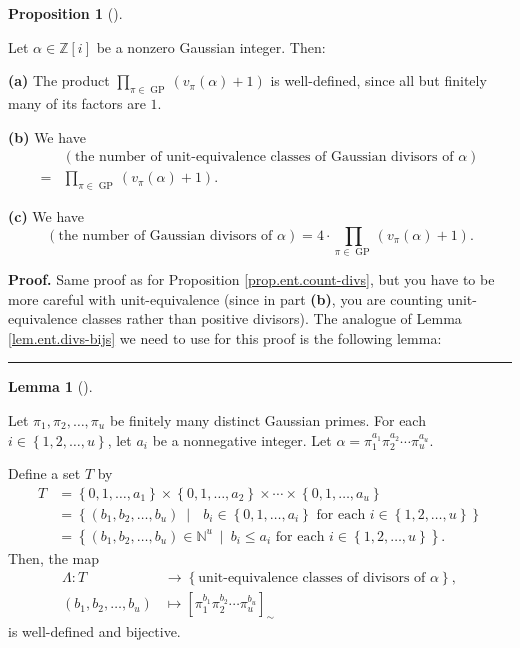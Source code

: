 \documentclass[numbers=enddot,12pt,final,onecolumn,notitlepage]{scrartcl}%
\numberwithin{exer}{subsection}
\theoremstyle{definition}
\newtheorem{lem}[theo]{Lemma}
\newenvironment{lemma}[1][]
{\begin{lem}[#1]\begin{leftbar}}
{\end{leftbar}\end{lem}}
\newtheorem{prop}[theo]{Proposition}
\newenvironment{proposition}[1][]
{\begin{prop}[#1]\begin{leftbar}}
{\end{leftbar}\end{prop}}
\newenvironment{proof}[1][Proof]{\noindent\textbf{#1.} }{\ \rule{0.5em}{0.5em}}
\let\prodnonlimits\prod
\renewcommand{\prod}{\prodnonlimits\limits}
\begin{document}
\begin{proposition}
Let $\alpha\in\mathbb{Z}\left[  i\right]  $ be a nonzero Gaussian integer. Then:

\textbf{(a)} The product $\prod_{\pi\in\operatorname*{GP}}\left(  v_{\pi
}\left(  \alpha\right)  +1\right)  $ is well-defined, since all but finitely
many of its factors are $1$.

\textbf{(b)} We have%
\begin{align*}
&  \left(  \text{the number of unit-equivalence classes of Gaussian divisors
of }\alpha\right) \\
=  &  \prod_{\pi\in\operatorname*{GP}}\left(  v_{\pi}\left(  \alpha\right)
+1\right)  .
\end{align*}


\textbf{(c)} We have%
\[
\left(  \text{the number of Gaussian divisors of }\alpha\right)  =4\cdot
\prod_{\pi\in\operatorname*{GP}}\left(  v_{\pi}\left(  \alpha\right)
+1\right)  .
\]

\end{proposition}

\begin{proof}
Same proof as for Proposition \ref{prop.ent.count-divs}, but you have to be
more careful with unit-equivalence (since in part \textbf{(b)}, you are
counting unit-equivalence classes rather than positive divisors). The analogue
of Lemma \ref{lem.ent.divs-bijs} we need to use for this proof is the
following lemma:
\end{proof}

\begin{lemma}
\label{lem.Z[i].divs-bijs}Let $\pi_{1},\pi_{2},\ldots,\pi_{u}$ be finitely
many distinct Gaussian primes. For each $i\in\left\{  1,2,\ldots,u\right\}  $,
let $a_{i}$ be a nonnegative integer. Let $\alpha=\pi_{1}^{a_{1}}\pi
_{2}^{a_{2}}\cdots\pi_{u}^{a_{u}}$.

Define a set $T$ by%
\begin{align*}
T  &  =\left\{  0,1,\ldots,a_{1}\right\}  \times\left\{  0,1,\ldots
,a_{2}\right\}  \times\cdots\times\left\{  0,1,\ldots,a_{u}\right\} \\
&  =\left\{  \left(  b_{1},b_{2},\ldots,b_{u}\right)  \ \mid\text{ }b_{i}%
\in\left\{  0,1,\ldots,a_{i}\right\}  \text{ for each }i\in\left\{
1,2,\ldots,u\right\}  \right\} \\
&  =\left\{  \left(  b_{1},b_{2},\ldots,b_{u}\right)  \in\mathbb{N}^{u}%
\ \mid\ b_{i}\leq a_{i}\text{ for each }i\in\left\{  1,2,\ldots,u\right\}
\right\}  .
\end{align*}
Then, the map%
\begin{align*}
\Lambda:T  &  \rightarrow\left\{  \text{unit-equivalence classes of divisors
of }\alpha\right\}  ,\\
\left(  b_{1},b_{2},\ldots,b_{u}\right)   &  \mapsto\left[  \pi_{1}^{b_{1}}%
\pi_{2}^{b_{2}}\cdots\pi_{u}^{b_{u}}\right]  _{\sim}%
\end{align*}
is well-defined and bijective.
\end{lemma}
\end{document}
